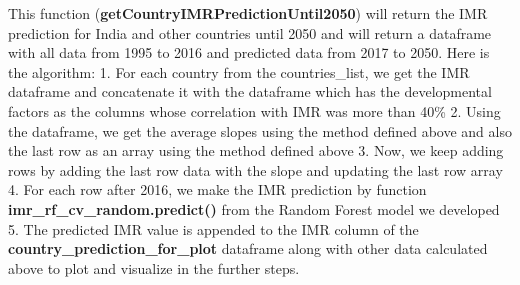 \documentclass[11pt]{article}
\begin{document}
    

    This function (\textbf{getCountryIMRPredictionUntil2050}) will return
the IMR prediction for India and other countries until 2050 and will
return a dataframe with all data from 1995 to 2016 and predicted data
from 2017 to 2050. Here is the algorithm: 1. For each country from the
countries\_list, we get the IMR dataframe and concatenate it with the
dataframe which has the developmental factors as the columns whose
correlation with IMR was more than 40\% 2. Using the dataframe, we get
the average slopes using the method defined above and also the last row
as an array using the method defined above 3. Now, we keep adding rows
by adding the last row data with the slope and updating the last row
array 4. For each row after 2016, we make the IMR prediction by function
\textbf{imr\_rf\_cv\_random.predict()} from the Random Forest model we
developed 5. The predicted IMR value is appended to the IMR column of
the \textbf{country\_prediction\_for\_plot} dataframe along with other
data calculated above to plot and visualize in the further steps.
\end{document}
